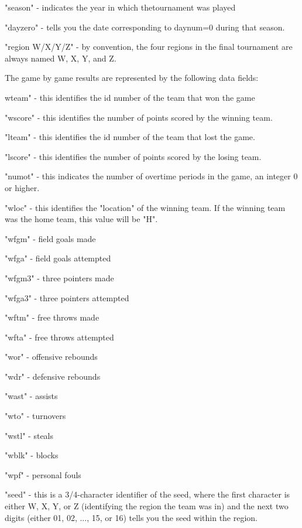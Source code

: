 \documentclass{article}
\begin{document}
\begin{multicols}{2}
\begin{list}{Field}{}
\item 
"season" - indicates the year in which thetournament was played
\item
"dayzero" - tells you the date corresponding to daynum=0 during that season. 
\item
"region W/X/Y/Z" - by convention, the four regions in the final tournament are always named W, X, Y, and Z.
\end{list}

	The game by game results are represented by the following data fields:
\begin{list}{Field}{}
\item
wteam" - this identifies the id number of the team that won the game
\item
"wscore" - this identifies the number of points scored by the winning team.
\item
"lteam" - this identifies the id number of the team that lost the game.
\item
"lscore" - this identifies the number of points scored by the losing team.
\item
"numot" - this indicates the number of overtime periods in the game, an integer 0 or higher.
\item
"wloc" - this identifies the "location" of the winning team. If the winning team was the home team, this value will be "H".
\item
"wfgm" - field goals made
\item
"wfga" - field goals attempted
\item
"wfgm3" - three pointers made
\item
"wfga3" - three pointers attempted
\item
"wftm" - free throws made
\item
"wfta" - free throws attempted
\item
"wor" - offensive rebounds
\item
"wdr" - defensive rebounds
\item
"wast" - assists
\item
"wto" - turnovers
\item
"wstl" - steals
\item
"wblk" - blocks
\item
"wpf" - personal fouls
\item
"seed" - this is a 3/4-character identifier of the seed, where the first character is either W, X, Y, or Z (identifying the region the team was in) and the next two digits (either 01, 02, ..., 15, or 16) tells you the seed within the region.

\end{list}
\end{multicols}
\end{document}
